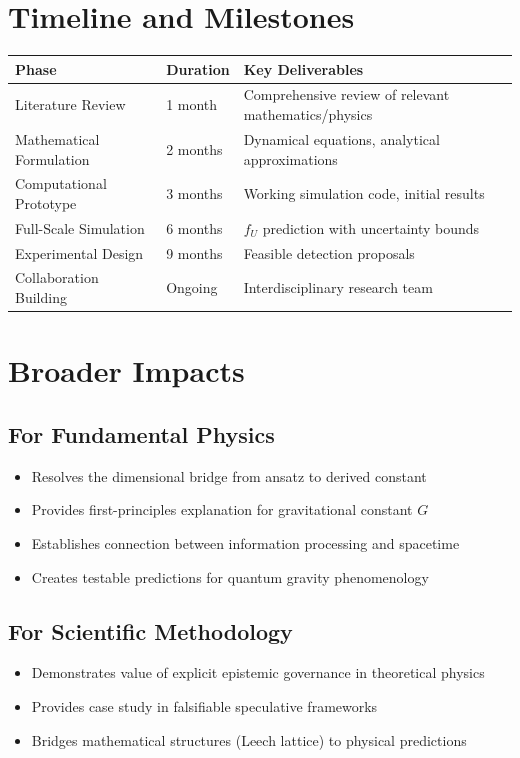 \documentclass[11pt]{article}
\begin{document}
\section{Timeline and Milestones}

\begin{tabular}{|l|l|l|}
\hline
\textbf{Phase} & \textbf{Duration} & \textbf{Key Deliverables} \\
\hline
Literature Review & 1 month & Comprehensive review of relevant mathematics/physics \\
Mathematical Formulation & 2 months & Dynamical equations, analytical approximations \\
Computational Prototype & 3 months & Working simulation code, initial results \\
Full-Scale Simulation & 6 months & $f_U$ prediction with uncertainty bounds \\
Experimental Design & 9 months & Feasible detection proposals \\
Collaboration Building & Ongoing & Interdisciplinary research team \\
\hline
\end{tabular}

\section{Broader Impacts}

\subsection{For Fundamental Physics}
\begin{itemize}
\item Resolves the dimensional bridge from ansatz to derived constant
\item Provides first-principles explanation for gravitational constant $G$
\item Establishes connection between information processing and spacetime
\item Creates testable predictions for quantum gravity phenomenology
\end{itemize}

\subsection{For Scientific Methodology}
\begin{itemize}
\item Demonstrates value of explicit epistemic governance in theoretical physics
\item Provides case study in falsifiable speculative frameworks
\item Bridges mathematical structures (Leech lattice) to physical predictions
\end{itemize}
\end{document}
